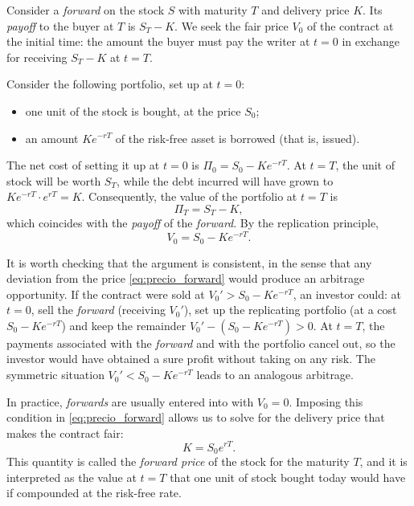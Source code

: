 \documentclass[11pt,a4paper,oneside]{report}
\theoremstyle{plain}
\theoremstyle{definition}
\theoremstyle{remark}
\newcommand{\1}{\mathbf{1}}
\begin{document}
Consider a \emph{forward} on the stock $S$ with maturity $T$ and
delivery price $K$. Its \emph{payoff} to the buyer at $T$ is
$S_T - K$. We seek the fair price $V_0$ of the contract at the initial
time: the amount the buyer must pay the writer at $t = 0$ in exchange
for receiving $S_T - K$ at $t = T$.

Consider the following portfolio, set up at $t = 0$:
\begin{itemize}
  \item one unit of the stock is bought, at the price $S_0$;
  \item an amount $K e^{-rT}$ of the risk-free asset is borrowed (that
        is, issued).
\end{itemize}
The net cost of setting it up at $t = 0$ is $\Pi_0 = S_0 - K e^{-rT}$.
At $t = T$, the unit of stock will be worth $S_T$, while the debt
incurred will have grown to $K e^{-rT} \cdot e^{rT} = K$. Consequently,
the value of the portfolio at $t = T$ is
\begin{equation*}
  \Pi_T = S_T - K,
\end{equation*}
which coincides with the \emph{payoff} of the \emph{forward}. By the
replication principle,
\begin{equation}\label{eq:precio_forward}
  V_0 = S_0 - K e^{-rT}.
\end{equation}

It is worth checking that the argument is consistent, in the sense
that any deviation from the price \eqref{eq:precio_forward} would
produce an arbitrage opportunity. If the contract were sold at
$V_0' > S_0 - K e^{-rT}$, an investor could: at $t = 0$, sell the
\emph{forward} (receiving $V_0'$), set up the replicating portfolio
(at a cost $S_0 - K e^{-rT}$) and keep the remainder
$V_0' - (S_0 - K e^{-rT}) > 0$. At $t = T$, the payments associated
with the \emph{forward} and with the portfolio cancel out, so the
investor would have obtained a sure profit without taking on any risk.
The symmetric situation $V_0' < S_0 - K e^{-rT}$ leads to an analogous
arbitrage.

In
practice, \emph{forwards} are usually entered into with $V_0 = 0$.
Imposing this condition in \eqref{eq:precio_forward} allows us to solve
for the delivery price that makes the contract fair:
\begin{equation}\label{eq:precio_forward_just}
  K = S_0 e^{rT}.
\end{equation}
This quantity is called the \emph{forward price} of the stock for the
maturity $T$, and it is interpreted as the value at $t = T$ that one
unit of stock bought today would have if compounded at the risk-free
rate.
\end{document}
